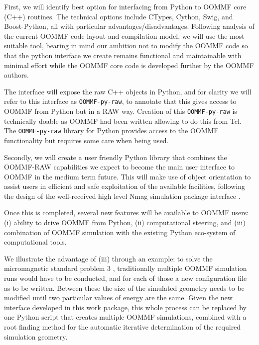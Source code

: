 \begin{workpackage}
\begin{tasklist}

\begin{task}[id=oommf-python-interface,title=OOMMF case study: Create Python interface to OOMMF code]

  First, we will identify best option for interfacing from Python to OOMMF
  core (C++) routines. The technical options include CTypes, Cython, Swig,
  and Boost-Python, all with particular
  advantages/disadvantages. Following analysis of the current OOMMF
  code layout and compilation model, we will use the most suitable
  tool, bearing in mind our ambition not to modify the OOMMF code so
  that the python interface we create remains functional and
  maintainable with minimal effort while the OOMMF core code is
  developed further by the OOMMF authors.

  The interface will expose the raw C++ objects in Python, and for
  clarity we will refer to this interface as \texttt{OOMMF-py-raw}, to
  annotate that this gives access to OOMMF from Python but in a RAW
  way. Creation of this \texttt{OOMMF-py-raw} is technically doable as
  OOMMF had been written allowing to do this from Tcl. The
  \texttt{OOMMF-py-raw} library for Python provides access to the
  OOMMF functionality but requires some care when being used.

  Secondly, we will create a user friendly Python library that
  combines the OOMMF-RAW capabilities we expect to become the main
  user interface to OOMMF in the medium term future. This will make
  use of object orientation to assist users in efficient and safe
  exploitation of the available facilities, following the design of
  the well-received high level Nmag simulation package
  \cite{Fischbacher2007a} interface \cite{Nmag-url}.

  Once this is completed, several new features will be available to
  OOMMF users: (i) ability to drive OOMMF from Python, (ii)
  computational steering, and (iii) combination of OOMMF simulation
  with the existing Python eco-system of computational tools.


  We illustrate the advantage of (iii) through an example: to solve
  the micromagnetic standard problem 3
  \cite{Micromagnetic-Standardproblem-3}, traditionally multiple OOMMF
  simulation runs would have to be conducted, and for each of those a
  new configuration file as to be written. Between these the size of
  the simulated geometry needs to be modified until two particular
  values of energy are the same. Given the new interface developed in
  this work package, this whole process can be replaced by one Python
  script that creates multiple OOMMF simulations, combined with a root
  finding method for the automatic iterative determination of the
  required simulation geometry.


\end{task}
\end{tasklist}
\end{workpackage}
